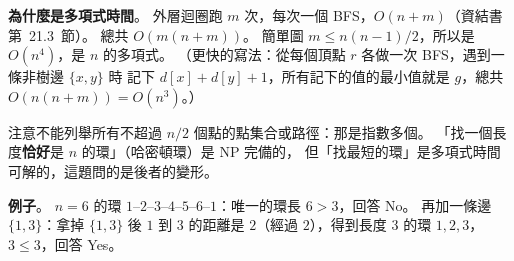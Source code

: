 \begin{pastsoln}
\textbf{為什麼是多項式時間}。 外層迴圈跑 $m$ 次，每次一個 BFS，$O(n + m)$（資結書第~21.3~節）。 總共 $O(m(n + m))$。 簡單圖
$m \le n(n-1)/2$，所以是 $O(n^4)$，是 $n$ 的多項式。 （更快的寫法：從每個頂點 $r$ 各做一次 BFS，遇到一條非樹邊 $\{x, y\}$ 時
記下 $d[x] + d[y] + 1$，所有記下的值的最小值就是 $g$，總共 $O(n(n + m)) = O(n^3)$。）

注意不能列舉所有不超過 $n/2$ 個點的點集合或路徑：那是指數多個。 「找一個長度\textbf{恰好}是 $n$ 的環」（哈密頓環）是 NP 完備的，
但「找最短的環」是多項式時間可解的，這題問的是後者的變形。

\textbf{例子}。 $n = 6$ 的環 $1$--$2$--$3$--$4$--$5$--$6$--$1$：唯一的環長 $6 > 3$，回答 No。 再加一條邊 $\{1, 3\}$：拿掉 $\{1, 3\}$
後 $1$ 到 $3$ 的距離是 $2$（經過 $2$），得到長度 $3$ 的環 $1, 2, 3$，$3 \le 3$，回答 Yes。
\end{pastsoln}
